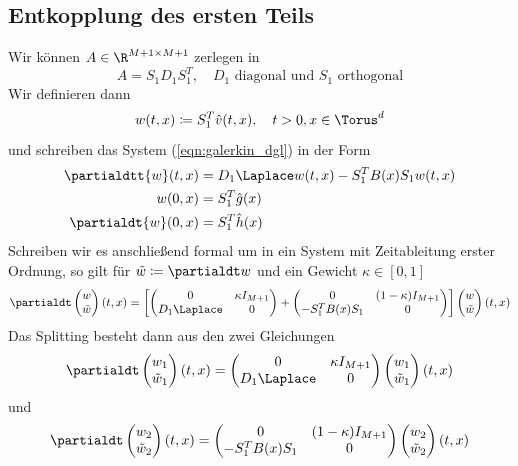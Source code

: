 \subsection{Entkopplung des ersten Teils}
Wir können $A\in\R^{M+1\times M+1}$ zerlegen in
\[A=S_1D_1S_1^T,\quad \text{$D_1$ diagonal und $S_1$ orthogonal}\]
Wir definieren dann 
\[w(t,x)\coloneqq S_1^T\hat{v}(t,x),\quad t>0,x\in\Torus^d\]
und schreiben das System (\ref{eqn:galerkin_dgl}) in der Form
\begin{equation}
\label{eqn:galerkin_dgl_transformed}
\begin{split}
\partialdtt{w}(t,x)&=D_1\Laplace w(t,x)-S_1^TB(x)S_1w(t,x)\\
w(0,x)&=S_1^T\hat{g}(x)\\
\partialdt{w}(0,x)&=S_1^T\hat{h}(x)\\
\end{split}
\end{equation}
Schreiben wir es anschließend formal um in ein System mit Zeitableitung erster Ordnung, so gilt für $\tilde{w}\coloneqq \partialdt w$ und ein Gewicht $\kappa\in[0,1]$
\[\partialdt\begin{pmatrix}w\\ \tilde{w}\end{pmatrix}(t,x)=\left[\begin{pmatrix}0 & \kappa I_{M+1}\\ D_1\Laplace& 0\end{pmatrix}+\begin{pmatrix}0&(1-\kappa)I_{M+1}\\-S_1^TB(x)S_1 & 0\end{pmatrix}\right]
\begin{pmatrix}w\\\tilde{w}\end{pmatrix}(t,x)\]
Das Splitting besteht dann aus den zwei Gleichungen
\begin{equation}
\label{eqn:galerkin_split1}
\partialdt\begin{pmatrix}w_1\\ \tilde{w}_1\end{pmatrix}(t,x)=\begin{pmatrix}0 & \kappa I_{M+1}\\ D_1\Laplace& 0\end{pmatrix}\begin{pmatrix}w_1\\\tilde{w}_1\end{pmatrix}(t,x)
\end{equation}
und
\begin{equation}
\label{eqn:galerkin_split2}
\partialdt\begin{pmatrix}w_2\\ \tilde{w}_2\end{pmatrix}(t,x)=\begin{pmatrix}0&(1-\kappa)I_{M+1}\\-S_1^TB(x)S_1 & 0\end{pmatrix}\begin{pmatrix}w_2\\\tilde{w}_2\end{pmatrix}(t,x)
\end{equation}
